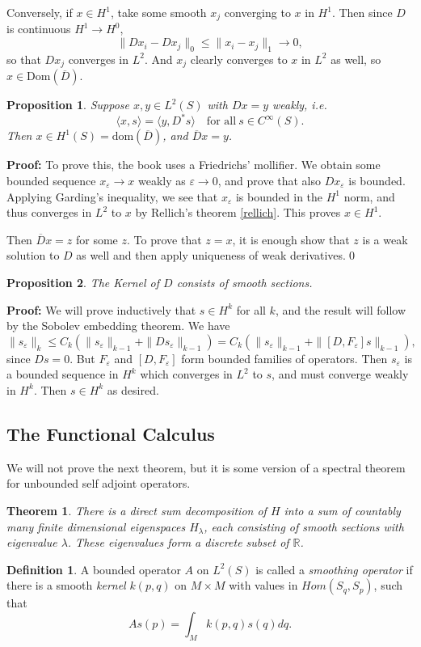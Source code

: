 \documentclass[12pt, reqno]{extarticle}
\theoremstyle{plain}
\newtheorem{theorem}{Theorem}[section]
\newtheorem{proposition}{Proposition}[section]
\theoremstyle{definition}
\newtheorem{definition}{Definition}[section]
\theoremstyle{remark}
\renewcommand{\epsilon}{\varepsilon}
\newcommand{\RR}{\mathbb{R}}
\begin{document}
Conversely, if $x \in H^1$, take some smooth $x_j$ converging to $x$ in $H^1$. Then since $D$
is continuous $H^1 \to H^0$, 
\[
    \|Dx_i - Dx_j\|_0 \leq \|x_i - x_j\|_1 \to 0,
\]
so that $Dx_j$ converges in $L^2$. And $x_j$ clearly converges to $x$ in $L^2$ as well, 
so $x \in \text{Dom}(\overline{D})$.

\begin{proposition}
    Suppose $x, y \in L^2(S)$ with $Dx = y$ weakly, i.e. 
    \[
        \langle x, s\rangle = \langle y, D^* s\rangle\quad \text{for all}\ s \in C^\infty(S).
    \]
    Then $x \in H^1(S) = \text{dom}(\overline{D})$, and $\overline{D}x = y$.
\end{proposition}

\textbf{Proof:} To prove this, the book uses a Friedrichs' mollifier. We obtain 
some bounded sequence $x_\epsilon \to x$ weakly as $\epsilon \to 0$, and prove that also $Dx_\epsilon$
is bounded. Applying Garding's inequality, we see that $x_\epsilon$ is bounded in the $H^1$ norm, and
thus converges in $L^2$ to $x$ by Rellich's theorem \ref{rellich}. This proves $x \in H^1$.

Then $\overline{D}x = z$ for some $z$. To prove that $z = x$, it is enough show that $z$ is a weak
solution to $D$ as well and then apply uniqueness of weak derivatives.\qed

\begin{proposition}
    The Kernel of $D$ consists of smooth sections. 
\end{proposition}

\textbf{Proof:} We will prove inductively that $s \in H^k$ for all $k$, and the result will follow by the 
Sobolev embedding theorem. We have 
\[
    \|s_\epsilon\|_k \leq C_k(\|s_\epsilon\|_{k-1} + \|Ds_\epsilon\|_{k-1}) 
    = C_k(\|s_\epsilon\|_{k-1} + \|[D,F_\epsilon]s\|_{k-1}),
\]
since $Ds = 0$. But $F_\epsilon$ and $[D,F_\epsilon]$ form bounded families of operators. Then
$s_\epsilon$ is a bounded sequence in $H^k$ which converges in $L^2$ to $s$, and must converge weakly in 
$H^k$. Then $s \in H^k$ as desired. 

\subsection{The Functional Calculus}

We will not prove the next theorem, but it is some version of a spectral theorem for unbounded
self adjoint operators. 

\begin{theorem}
    There is a direct sum decomposition of $H$ into a sum of countably many finite dimensional
    eigenspaces $H_\lambda$, each consisting of smooth sections with eigenvalue $\lambda$. 
    These eigenvalues form a discrete subset of $\RR$.
\end{theorem}




\begin{definition}
    A bounded operator $A$ on $L^2(S)$ is called a \textit{smoothing operator} if there is
    a smooth \textit{kernel} $k(p,q)$ on $M\times M$ with values in $Hom(S_q, S_p)$, such
    that 
    \[
        As(p) = \int_M k(p,q)s(q)dq.
    \]
\end{definition}
\end{document}
